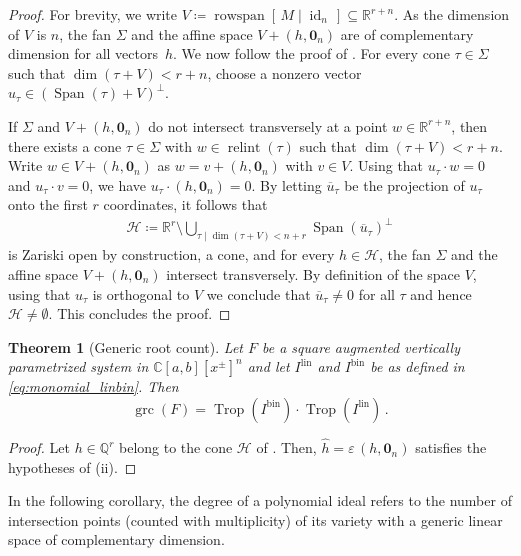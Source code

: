 \documentclass[11pt,reqno,a4paper]{amsart}
\numberwithin{equation}{section}
\theoremstyle{theoremstyle}
\newtheorem{theorem}{Theorem}[section]
\theoremstyle{examplestyle}
\newcommand{\CC}{\mathbb{C}}
\newcommand{\RR}{\mathbb{R}}
\newcommand{\QQ}{\mathbb{Q}}
\newcommand{\lin}{{\mathrm{lin}}}
\newcommand{\bin}{{\mathrm{bin}}}
\DeclareMathOperator{\grc}{grc}
\DeclareMathOperator{\rowspan}{rowspan}
\DeclareMathOperator{\id}{id}
\DeclareMathOperator{\relint}{relint}
\DeclareMathOperator{\Span}{Span}
\DeclareMathOperator{\Trop}{Trop}
\begin{document}
\begin{proof}
For brevity, we write 
$V \coloneqq \rowspan  [\,M\mid \id_n\,]\subseteq \RR^{r+n}$.
As the dimension of $V$ is $n$, the fan $\Sigma$ and the affine space $V +(h,\mathbf{0}_{n} )$ are of complementary dimension for all vectors~$h$. 
 We now follow the proof of \cite[Proposition~3.6.12]{MaclaganSturmfels15}. 
For every cone $\tau \in \Sigma$  such that 
$\dim (\tau + V) <r+n$, choose a nonzero vector $u_\tau \in (\Span(\tau)+ V)^\perp$.

If $\Sigma$ and $V+(h,\mathbf{0}_{n} )$ do not intersect transversely at a point $w \in \RR^{r+n}$, then there exists a cone 
$\tau \in \Sigma$ with $w \in \relint(\tau)$ such that 
$\dim (\tau+V) <r+n$.  Write $w \in V +(h,\mathbf{0}_{n})$ as $w = v + (h,\mathbf{0}_{n} )$ with $v\in V$. Using  that $u_\tau \cdot w = 0$ and $u_\tau \cdot v = 0$, we have $u_\tau \cdot (h,\mathbf{0}_{n} ) = 0$.
By letting $\overline{u}_\tau$ be the projection of $u_\tau$ onto the first $r$ coordinates,  it follows that
\begin{align*}
    \mathcal{H} \coloneqq \RR^r \setminus 
   \bigcup_{\tau \mid \dim (\tau + V) <n +r}  \Span(\overline{u}_\tau) ^\perp
\end{align*}
is Zariski open by construction, a cone, and for every $h \in \mathcal{H}$, the fan $\Sigma$ and the affine space $V+(h,\mathbf{0}_{n} )$ intersect transversely.  
By definition of the space $V$, using that  $u_\tau$ is orthogonal to $V$ we conclude that 
$\overline{u}_\tau\neq 0$ for all $\tau$ and hence $\mathcal{H}\neq \emptyset$. 
This concludes the proof. 
\end{proof}


\begin{theorem}[Generic root count]\label{thm:grc}
Let $F$ be a square augmented vertically parametrized system in $\CC[a,b][x^\pm]^n$ and  
let $I^{\lin}$ and $I^{\bin}$ be as defined in \eqref{eq:monomial_linbin}. Then
\[\grc(F)= \Trop(I^{\bin}) \cdot \Trop(I^{\lin})\, .\]
\end{theorem}
\begin{proof}
Let $h\in \QQ^r$ belong to the cone $\mathcal{H}$ of . Then,
$\hat{h}=\varepsilon\, (h, \mathbf{0}_{n})$ satisfies the hypotheses of (ii).
\end{proof}



In the following corollary,
the degree of a polynomial ideal refers to the number of intersection points (counted with multiplicity) of its variety with a generic linear space of complementary dimension.
\end{document}
